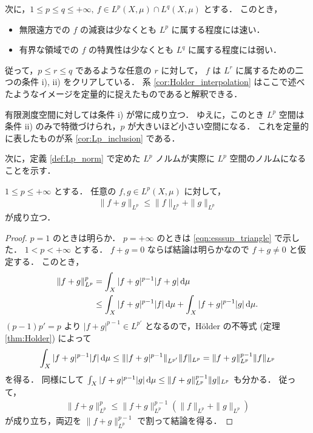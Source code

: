 \begin{remark}
    次に，$1\le p\le q\le+\infty,\ f\in L^p(X,\mu)\cap L^q(X,\mu)$ とする．
    このとき，
    \begin{itemize}
        \item 無限遠方での $f$ の減衰は少なくとも $L^p$ に属する程度には速い．
        \item 有界な領域での $f$ の特異性は少なくとも $L^q$ に属する程度には弱い．
    \end{itemize}
    従って，$p\le r\le q$ であるような任意の $r$ に対して，
    $f$ は $L^r$ に属するための二つの条件 \textrm{i)}, \textrm{ii)} をクリアしている．
    系 \ref{cor:Holder_interpolation} はここで述べたようなイメージを定量的に捉えたものであると解釈できる．

    有限測度空間に対しては条件 \textrm{i)} が常に成り立つ．
    ゆえに，このとき $L^p$ 空間は条件 \textrm{ii)} のみで特徴づけられ，$p$ が大きいほど小さい空間になる．
    これを定量的に表したものが系 \ref{cor:Lp_inclusion} である．
\end{remark}

次に，定義 \ref{def:Lp_norm} で定めた $L^p$ ノルムが実際に $L^p$ 空間のノルムになることを示す．

\begin{theorem}\label{thm:Minkowski}
    $1\le p\le+\infty$ とする．
    任意の $f,g\in L^p(X,\mu)$ に対して，
    \begin{align*}
        \|f+g\|_{L^p}\le\|f\|_{L^p}+\|g\|_{L^p}
    \end{align*}
    が成り立つ．
\end{theorem}

\begin{proof}
    $p=1$ のときは明らか．
    $p=+\infty$ のときは \eqref{eqn:esssup_triangle} で示した．
    $1<p<+\infty$ とする．
    $f+g=0$ ならば結論は明らかなので $f+g\ne0$ と仮定する．
    このとき，
    \begin{align*}
        \|f+g\|_{L^p}^p
        &=\int_X|f+g|^{p-1}|f+g|\,\mathrm{d}\mu\\
        &\le\int_X|f+g|^{p-1}|f|\,\mathrm{d}\mu+\int_X|f+g|^{p-1}|g|\,\mathrm{d}\mu.
    \end{align*}
    $(p-1)p'=p$ より $|f+g|^{p-1}\in L^{p'}$ となるので，H\"older の不等式 (定理 \ref{thm:Holder}) によって
    \begin{align*}
        \int_X|f+g|^{p-1}|f|\,\mathrm{d}\mu
        \le\||f+g|^{p-1}\|_{L^{p'}}\|f\|_{L^p}
        =\|f+g\|_{L^p}^{p-1}\|f\|_{L^p}
    \end{align*}
    を得る．
    同様にして $\int_X|f+g|^{p-1}|g|\,\mathrm{d}\mu\le\|f+g\|_{L^p}^{p-1}\|g\|_{L^p}$ も分かる．
    従って，
    \begin{align*}
        \|f+g\|_{L^p}^p
        \le\|f+g\|_{L^p}^{p-1}(\|f\|_{L^p}+\|g\|_{L^p})
    \end{align*}
    が成り立ち，両辺を $\|f+g\|_{L^p}^{p-1}$ で割って結論を得る．
\end{proof}

